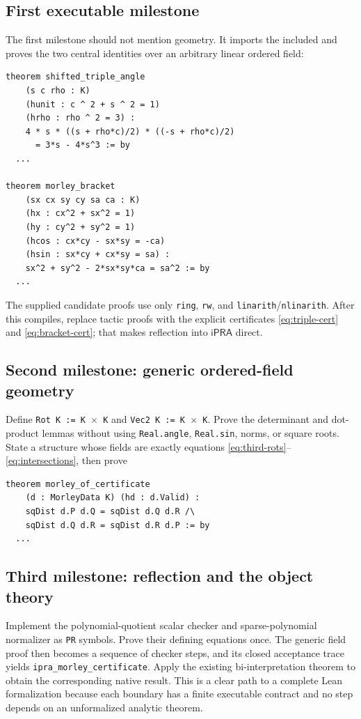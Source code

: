 \documentclass[11pt]{article}
\theoremstyle{definition}
\newcommand{\iPRA}{\mathsf{iPRA}}
\newcommand{\code}[1]{\texttt{#1}}
\begin{document}
\subsection{First executable milestone}
The first milestone should not mention geometry.  It imports the included
 and proves the two central identities over an arbitrary
linear ordered field:
\begin{lstlisting}[language=Lean]
theorem shifted_triple_angle
    (s c rho : K)
    (hunit : c ^ 2 + s ^ 2 = 1)
    (hrho : rho ^ 2 = 3) :
    4 * s * ((s + rho*c)/2) * ((-s + rho*c)/2)
      = 3*s - 4*s^3 := by
  ...

theorem morley_bracket
    (sx cx sy cy sa ca : K)
    (hx : cx^2 + sx^2 = 1)
    (hy : cy^2 + sy^2 = 1)
    (hcos : cx*cy - sx*sy = -ca)
    (hsin : sx*cy + cx*sy = sa) :
    sx^2 + sy^2 - 2*sx*sy*ca = sa^2 := by
  ...
\end{lstlisting}
The supplied candidate proofs use only \code{ring}, \code{rw}, and
\code{linarith}/\code{nlinarith}.  After this compiles, replace tactic proofs
with the explicit certificates \eqref{eq:triple-cert} and
\eqref{eq:bracket-cert}; that makes reflection into $\iPRA$ direct.

\subsection{Second milestone: generic ordered-field geometry}
Define \code{Rot K := K \ensuremath{\times} K} and \code{Vec2 K := K
\ensuremath{\times} K}.  Prove the determinant and dot-product lemmas without
using \code{Real.angle}, \code{Real.sin}, norms, or square roots.  State a
structure whose fields are exactly equations \eqref{eq:third-rots}--
\eqref{eq:intersections}, then prove
\begin{lstlisting}[language=Lean]
theorem morley_of_certificate
    (d : MorleyData K) (hd : d.Valid) :
    sqDist d.P d.Q = sqDist d.Q d.R /\
    sqDist d.Q d.R = sqDist d.R d.P := by
  ...
\end{lstlisting}

\subsection{Third milestone: reflection and the object theory}
Implement the polynomial-quotient scalar checker and sparse-polynomial
normalizer as \code{PR} symbols.
Prove their defining equations once.  The generic field proof then becomes a
sequence of checker steps, and its closed acceptance trace yields
\code{ipra\_morley\_certificate}.  Apply the existing bi-interpretation theorem
to obtain the corresponding native result.  This is a clear path to a
complete Lean formalization because each boundary has a finite executable
contract and no step depends on an unformalized analytic theorem.
\end{document}
